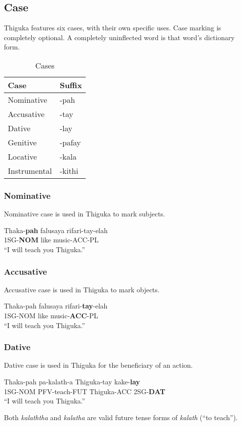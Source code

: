 \newpage{}

\subsection{Case}
Thiguka features six cases, with their own specific uses.
Case marking is completely optional.
A completely uninflected word is that word's dictionary form.

\begin{table}[h!]
    \centering
    \caption{Cases}
    \begin{tabularx}{8cm}{|X|X|}
        \hline
        \textbf{Case} & \textbf{Suffix} \\
        \hline
        Nominative & -pah \\
        Accusative & -tay \\
        Dative & -lay \\
        Genitive & -pafay \\
        Locative & -kala \\
        Instrumental & -kithi \\ 
        \hline
    \end{tabularx}
\end{table}

\subsubsection{Nominative}
Nominative case is used in Thiguka to mark subjects.
\begin{exe}
    \ex{} \gll{}Thaka-\textbf{pah} falusaya rifari-tay-elah\\
                1SG-\textbf{NOM}            like     music-ACC-PL\\
        \glt{}``I will teach you Thiguka.''
\end{exe}

\subsubsection{Accusative}
Accusative case is used in Thiguka to mark objects.
\begin{exe}
    \ex{} \gll{}Thaka-pah falusaya rifari-\textbf{tay}-elah\\
                1SG-NOM            like     music-\textbf{ACC}-PL\\
        \glt{}``I will teach you Thiguka.''
\end{exe}

\subsubsection{Dative}
Dative case is used in Thiguka for the beneficiary of an action.
\begin{exe}
    \ex{} \gll{}Thaka-pah pa-kalath-a   Thiguka-tay kake-\textbf{lay}\\
                1SG-NOM   PFV-teach-FUT Thiguka-ACC 2SG-\textbf{DAT}\\
        \glt{}``I will teach you Thiguka.''
\end{exe}
Both \textit{kalaththa} and \textit{kalatha} are valid future tense forms of \textit{kalath} (``to teach'').

